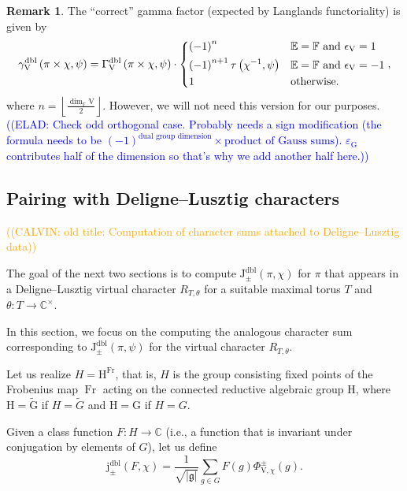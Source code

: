 \documentclass[12pt, reqno]{amsart}
\theoremstyle{definition}
\theoremstyle{definition}
\newtheorem{remark}[theorem]{Remark}
\theoremstyle{definition}
\newcommand{\cComplex}{\mathbb{C}}
\newcommand{\multiplicativegroup}[1]{#1^{\times}}
\newcommand{\sizeof}[1]{\left|#1\right|}
\newcommand{\hermitianSpace}{\mathrm{V}}
\newcommand{\fieldCharacter}{\psi}
\newcommand{\finiteField}{\mathbb{F}}
\newcommand{\quadraticExtension}{\mathbb{E}}
\newcommand{\Frobenius}{\operatorname{Fr}}
\newcommand{\genHermitianJacobiKernel}[2]{\Phi^{\pm}_{#1,#2}}
\newcommand{\dblJacobiSumScalar}[2]{\mathrm{J}_{\pm}^{\mathrm{dbl}}\left(#1, #2\right)}
\newcommand{\dblVirtualJacobiSumScalar}[2]{\mathrm{j}_{\pm}^{\mathrm{dbl}}\left(#1, #2\right)}
\newcommand{\dblGammaFactorSpace}[4]{\Gamma^{\mathrm{dbl}}_{#1}\left(#2 \times #3, #4\right)}
\newcommand{\dblLanglandsGammaFactorSpace}[4]{\gamma^{\mathrm{dbl}}_{#1}\left(#2 \times #3, #4\right)}
\newcommand{\lieAlgebra}{\mathfrak{g}}
\newcommand{\algebraicGroup}[1]{\boldsymbol{\mathrm{#1}}}
\newcommand{\calvin}[1]{\textcolor{orange}{\sffamily ((CALVIN: #1))}}
\newcommand{\elad}[1]{\textcolor{blue}{\sffamily ((ELAD: #1))}}
\begin{document}
\begin{remark}
	The ``correct'' gamma factor (expected by Langlands functoriality) is given by $$\dblLanglandsGammaFactorSpace{\hermitianSpace}{\pi}{\chi}{\fieldCharacter} = \dblGammaFactorSpace{\hermitianSpace}{\pi}{\chi}{\fieldCharacter} \cdot \begin{dcases}
				\left(-1\right)^n & \quadraticExtension = \finiteField \text{ and } \epsilon_{\hermitianSpace} = 1\\
				\left(-1\right)^{n+1} \tau\left(\chi^{-1}, \fieldCharacter\right) & \quadraticExtension = \finiteField \text{ and } \epsilon_{\hermitianSpace} = -1 \\
				1 & \text{otherwise.}
	\end{dcases},$$
	where $n = \left\lfloor \frac{\dim_{\finiteField} \hermitianSpace}{2} \right\rfloor$.
	However, we will not need this version for our purposes. \elad{Check odd orthogonal case. Probably needs a sign modification (the formula needs to be $\left(-1\right)^{\text{dual group dimension}} \times \text{product of Gauss sums}$). $\varepsilon_{\algebraicGroup{G}}$ contributes half of the dimension so that's why we add another half here.}
\end{remark}

\subsection{Pairing with Deligne--Lusztig characters}
\calvin{old title: Computation of character sums attached to Deligne--Lusztig data}

The goal of the next two sections is to compute $\dblJacobiSumScalar{\pi}{\chi}$ for $\pi$ that appears in a Deligne--Lusztig virtual character $R_{T,\theta}$ for a suitable maximal torus $T$ and $\theta \colon T \to \multiplicativegroup{\cComplex}$.

In this section, we focus on the computing the analogous character sum corresponding to $\dblJacobiSumScalar{\pi}{\fieldCharacter}$ for the virtual character $R_{T,\theta}$.

Let us realize $H = \algebraicGroup{H}^{\Frobenius}$, that is, $H$ is the group consisting fixed points of the Frobenius map $\Frobenius$ acting on the connected reductive algebraic group $\algebraicGroup{H}$, where $\algebraicGroup{H} = \tilde{\algebraicGroup{G}}$ if $H = \tilde{G}$ and $\algebraicGroup{H} = \algebraicGroup{G}$ if $H = G$.

Given a class function $F \colon H \to \cComplex$ (i.e., a function that is invariant under conjugation by elements of $G$), let us define $$\dblVirtualJacobiSumScalar{F}{\chi} = \frac{1}{\sqrt{\sizeof{\lieAlgebra}}} \sum_{g \in G} F\left(g\right) \genHermitianJacobiKernel{\hermitianSpace}{\chi}\left(g\right).$$
\end{document}
